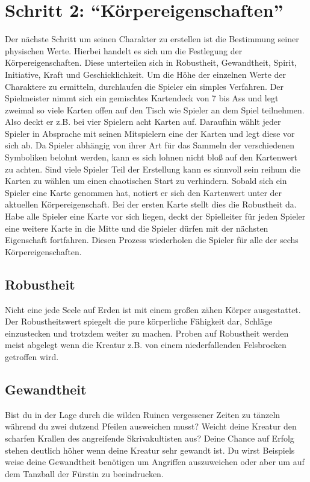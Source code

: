 
    \section{Schritt 2: “Körpereigenschaften”}
        Der nächste Schritt um seinen Charakter zu erstellen ist die Bestimmung seiner physischen Werte. Hierbei handelt es sich um die Festlegung der Körpereigenschaften. Diese unterteilen sich in Robustheit, Gewandtheit, Spirit, Initiative, Kraft und Geschicklichkeit. Um die Höhe der einzelnen Werte der Charaktere zu ermitteln, durchlaufen die Spieler ein simples Verfahren. Der Spielmeister nimmt sich ein gemischtes Kartendeck von 7 bis Ass und legt zweimal so viele Karten offen auf den Tisch wie Spieler an dem Spiel teilnehmen. Also deckt er z.B. bei vier Spielern acht Karten auf. Daraufhin wählt jeder Spieler in Absprache mit seinen Mitspielern eine der Karten und legt diese vor sich ab. Da Spieler abhängig von ihrer Art für das Sammeln der verschiedenen Symboliken belohnt werden, kann es sich lohnen nicht bloß auf den Kartenwert zu achten.  Sind viele Spieler Teil der Erstellung kann es sinnvoll sein reihum die Karten zu wählen um einen chaotischen Start zu verhindern. Sobald sich ein Spieler eine Karte genommen hat, notiert er sich den Kartenwert unter der aktuellen Körpereigenschaft. Bei der ersten Karte stellt dies die Robustheit da. Habe alle Spieler eine Karte vor sich liegen, deckt der Spielleiter für jeden Spieler eine weitere Karte in die Mitte und die Spieler dürfen mit der nächsten Eigenschaft fortfahren. Diesen Prozess wiederholen die Spieler für alle der sechs Körpereigenschaften. 
        
        \subsection*{Robustheit}
            Nicht eine jede Seele auf Erden ist mit einem großen zähen Körper ausgestattet. Der Robustheitswert spiegelt die pure körperliche Fähigkeit dar, Schläge einzustecken und trotzdem weiter zu machen. Proben auf Robustheit werden meist abgelegt wenn die Kreatur z.B. von einem niederfallenden Felsbrocken getroffen wird.

        
        \subsection*{Gewandtheit}
            Bist du in der Lage durch die wilden Ruinen vergessener Zeiten zu tänzeln während du zwei dutzend Pfeilen ausweichen musst? Weicht deine Kreatur den scharfen Krallen des angreifende Skrivakultisten aus? Deine Chance auf Erfolg stehen deutlich höher wenn deine Kreatur sehr gewandt ist. Du wirst Beispiels weise deine Gewandtheit benötigen um Angriffen auszuweichen oder aber um auf dem Tanzball der Fürstin zu beeindrucken.

